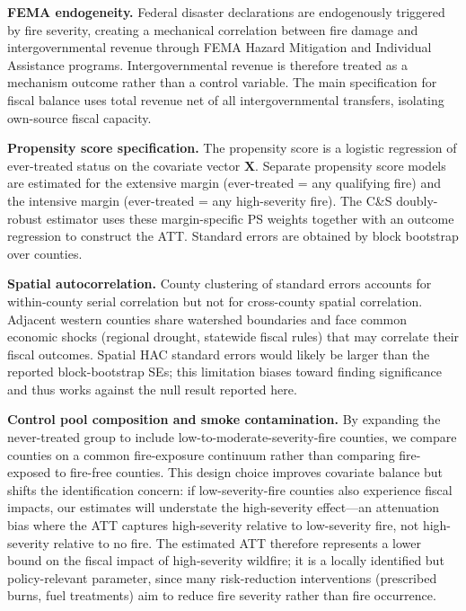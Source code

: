 \documentclass[12pt]{article}
\begin{document}
\textbf{FEMA endogeneity.} Federal disaster declarations are endogenously triggered by
fire severity, creating a mechanical correlation between fire damage and
intergovernmental revenue through FEMA Hazard Mitigation and Individual Assistance
programs. Intergovernmental revenue is therefore treated as a mechanism outcome
rather than a control variable. The main specification for fiscal balance uses
total revenue net of all intergovernmental transfers, isolating own-source
fiscal capacity.

\textbf{Propensity score specification.} The propensity score is a logistic
regression of ever-treated status on the covariate vector $\mathbf{X}$.
Separate propensity score models are estimated for the extensive margin
(ever-treated = any qualifying fire) and the intensive margin (ever-treated =
any high-severity fire). The C\&S doubly-robust estimator uses these
margin-specific PS weights together with an outcome regression to construct
the ATT. Standard errors are obtained by block bootstrap over counties.

\textbf{Spatial autocorrelation.} County clustering of standard errors accounts
for within-county serial correlation but not for cross-county spatial correlation.
Adjacent western counties share watershed boundaries and face common economic
shocks (regional drought, statewide fiscal rules) that may correlate their fiscal
outcomes. Spatial HAC standard errors would likely be larger than the reported
block-bootstrap SEs; this limitation biases toward finding significance and thus
works against the null result reported here.

\textbf{Control pool composition and smoke contamination.} By expanding the
never-treated group to include low-to-moderate-severity-fire counties, we compare
counties on a common fire-exposure continuum rather than comparing fire-exposed to
fire-free counties. This design choice improves covariate balance but shifts the
identification concern: if low-severity-fire counties also experience fiscal impacts,
our estimates will understate the high-severity effect---an attenuation bias where
the ATT captures high-severity relative to low-severity fire, not high-severity
relative to no fire. The estimated ATT therefore represents a lower bound on the
fiscal impact of high-severity wildfire; it is a locally identified but
policy-relevant parameter, since many risk-reduction interventions (prescribed
burns, fuel treatments) aim to reduce fire severity rather than fire occurrence.

\end{document}
